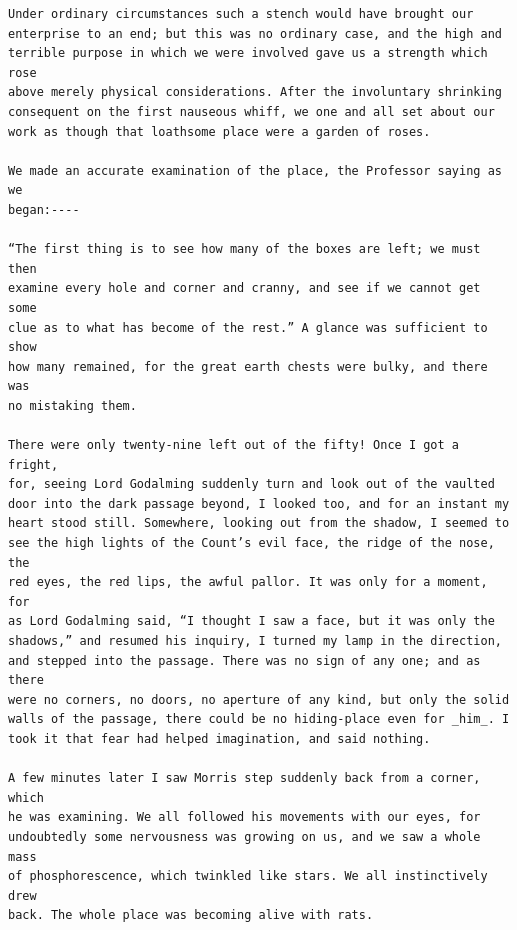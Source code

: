 \documentclass{article}
\begin{document}
\begin{verbatim}
Under ordinary circumstances such a stench would have brought our
enterprise to an end; but this was no ordinary case, and the high and
terrible purpose in which we were involved gave us a strength which rose
above merely physical considerations. After the involuntary shrinking
consequent on the first nauseous whiff, we one and all set about our
work as though that loathsome place were a garden of roses.

We made an accurate examination of the place, the Professor saying as we
began:----

“The first thing is to see how many of the boxes are left; we must then
examine every hole and corner and cranny, and see if we cannot get some
clue as to what has become of the rest.” A glance was sufficient to show
how many remained, for the great earth chests were bulky, and there was
no mistaking them.

There were only twenty-nine left out of the fifty! Once I got a fright,
for, seeing Lord Godalming suddenly turn and look out of the vaulted
door into the dark passage beyond, I looked too, and for an instant my
heart stood still. Somewhere, looking out from the shadow, I seemed to
see the high lights of the Count’s evil face, the ridge of the nose, the
red eyes, the red lips, the awful pallor. It was only for a moment, for
as Lord Godalming said, “I thought I saw a face, but it was only the
shadows,” and resumed his inquiry, I turned my lamp in the direction,
and stepped into the passage. There was no sign of any one; and as there
were no corners, no doors, no aperture of any kind, but only the solid
walls of the passage, there could be no hiding-place even for _him_. I
took it that fear had helped imagination, and said nothing.

A few minutes later I saw Morris step suddenly back from a corner, which
he was examining. We all followed his movements with our eyes, for
undoubtedly some nervousness was growing on us, and we saw a whole mass
of phosphorescence, which twinkled like stars. We all instinctively drew
back. The whole place was becoming alive with rats.


\end{verbatim}
\end{document}
